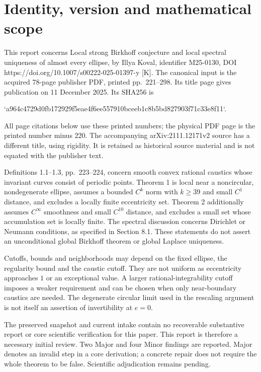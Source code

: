 \documentclass[10pt]{article}
\begin{document}
\section*{Identity, version and mathematical scope}
This report concerns Local strong Birkhoff conjecture and local spectral uniqueness of almost every ellipse, by Illya Koval, identifier M25-0130, DOI https://doi.org/10.1007/s00222-025-01397-y [K]. The canonical input is the acquired 78-page publisher PDF, printed pp. 221–298. Its title page gives publication on 11 December 2025. Its SHA256 is\par
`a964c4729d0fb172929f5eae4f6ee557910bceeb1c8b5bd827903f71c33e8f11`.\par
All page citations below use these printed numbers; the physical PDF page is the printed number minus 220. The accompanying arXiv:2111.12171v2 source has a different title, using rigidity. It is retained as historical source material and is not equated with the publisher text.\par
Definitions 1.1–1.3, pp. 223–224, concern smooth convex rational caustics whose invariant curves consist of periodic points. Theorem 1 is local near a noncircular, nondegenerate ellipse, assumes a bounded \(C^k\) norm with \(k\geq39\) and small \(C^1\) distance, and excludes a locally finite eccentricity set. Theorem 2 additionally assumes \(C^\infty\) smoothness and small \(C^{10}\) distance, and excludes a small set whose accumulation set is locally finite. The spectral discussion concerns Dirichlet or Neumann conditions, as specified in Section 8.1. These statements do not assert an unconditional global Birkhoff theorem or global Laplace uniqueness.\par
Cutoffs, bounds and neighborhoods may depend on the fixed ellipse, the regularity bound and the caustic cutoff. They are not uniform as eccentricity approaches \(1\) or an exceptional value. A larger rational-integrability cutoff imposes a weaker requirement and can be chosen when only near-boundary caustics are needed. The degenerate circular limit used in the rescaling argument is not itself an assertion of invertibility at \(e=0\).\par
The preserved snapshot and current intake contain no recoverable substantive report or core scientific verification for this paper. This report is therefore a necessary initial review. Two Major and four Minor findings are reported. Major denotes an invalid step in a core derivation; a concrete repair does not require the whole theorem to be false. Scientific adjudication remains pending.\par
\end{document}
